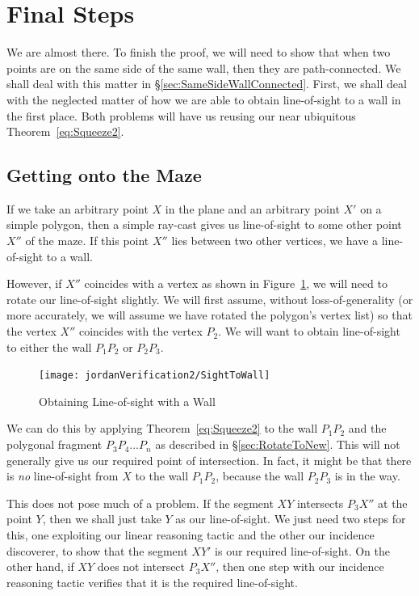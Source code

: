 \section{Final Steps}
We are almost there. To finish the proof, we will need to show that when two points are on the same side of the same wall, then they are path-connected. We shall deal with this matter in \S\ref{sec:SameSideWallConnected}. First, we shall deal with the neglected matter of how we are able to obtain line-of-sight to a wall in the first place. Both problems will have us reusing our near ubiquitous Theorem~\ref{eq:Squeeze2}.

\subsection{Getting onto the Maze}
If we take an arbitrary point $X$ in the plane and an arbitrary point $X'$ on a simple polygon, then a simple ray-cast gives us line-of-sight to some other point $X''$ of the maze. If this point $X''$ lies between two other vertices, we have a line-of-sight to a wall. 

However, if $X''$ coincides with a vertex as shown in Figure~\ref{fig:SightToWall}, we will need to rotate our line-of-sight slightly. We will first assume, without loss-of-generality (or more accurately, we will assume we have rotated the polygon's vertex list) so that the vertex $X''$ coincides with the vertex $P_2$. We will want to obtain line-of-sight to either the wall $P_1P_2$ or $P_2P_3$.

\begin{figure}
  \centering\texttt{[image: jordanVerification2/SightToWall]}
  \caption{Obtaining Line-of-sight with a Wall}
  \label{fig:SightToWall}
\end{figure}

We can do this by applying Theorem~\ref{eq:Squeeze2} to the wall $P_1P_2$ and the polygonal fragment $P_3P_4\ldots P_n$ as described in \S\ref{sec:RotateToNew}. This will not generally give us our required point of intersection. In fact, it might be that there is \emph{no} line-of-sight from $X$ to the wall $P_1P_2$, because the wall $P_2P_3$ is in the way. 

This does not pose much of a problem. If the segment $XY$ intersects $P_3X''$ at the point $Y$, then we shall just take $Y$ as our line-of-sight. We just need two steps for this, one exploiting our linear reasoning tactic and the other our incidence discoverer, to show that the segment $XY'$ is our required line-of-sight. On the other hand, if $XY$ does not intersect $P_3X''$, then one step with our incidence reasoning tactic verifies that it is the required line-of-sight. 

